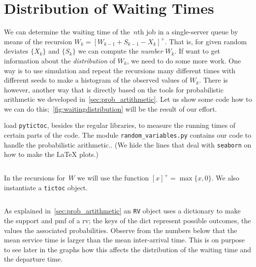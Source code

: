 \documentclass[stochastic-or.tex]{subfiles}
\begin{document}
\section{Distribution of Waiting Times}
\label{sec:comp-with-rand}


We can determine the waiting time of the~$n$th job in a single-server queue by means of the recursion $W_{k} = [W_{k-1} + S_{k-1}-X_{k}]^{+}$.
That is, for given random deviates $\{X_{k}\}$ and $\{S_{k}\}$ we can compute the \emph{number} $W_{k}$.
If want to get information about the \emph{distribution} of $W_{k}$, we need to do some more work.
One way is to use simulation and repeat the recursions many different times with different seeds to make a histogram of the observed values of $W_{k}$.
There is however, another way that is directly based on the tools for probabilistic arithmetic we developed in~\cref{sec:prob_artithmetic}.
Let us show some code how to we can do this;~\cref{fig:waitingdistribution} will be the result of our effort.

  load \texttt{pytictoc}, besides the regular libraries, to measure the running times of certain parts of the code.
The module \texttt{random_variables.py} contains our code to handle the probabilistic arithmetic..
(We hide the lines that deal with \texttt{seaborn} on how to make the \LaTeX\/ plots.)
\inputminted[firstline=2, lastline=6]{python}{../code/waiting_time_distribution.py} %

In the recursions for~$W$ we will use the function $[x]^{+} = \max\{x, 0\}$. We also instantiate a \texttt{tictoc} object.
\inputminted[firstline=18, lastline=23]{python}{../code/waiting_time_distribution.py} %


As explained in~\cref{sec:prob_artithmetic} an \texttt{RV} object uses a dictionary to make the support and pmf of a rv; the keys of the dict represent possible outcomes, the values the associated  probabilities.
Observe from the numbers below that the mean service time is larger than the mean inter-arrival time.
This is on purpose to see later in the graphs how this affects the distribution of the waiting time and the departure time.
\inputminted[firstline=27, lastline=28]{python}{../code/waiting_time_distribution.py} %
\end{document}
